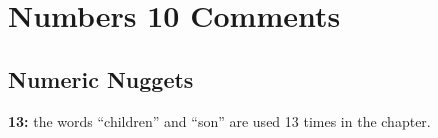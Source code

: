 \section{Numbers 10 Comments}

\subsection{Numeric Nuggets}
\textbf{13: } the words ``children'' and ``son'' are used 13 times in the chapter.
